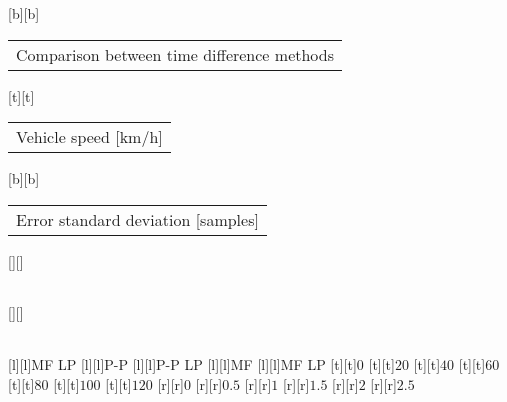 %
%
[b][b]{\fontsize{8}{12}\selectfont \setlength{\tabcolsep}{0pt}\begin{tabular}{c}Comparison between time difference methods\end{tabular}}%
[t][t]{\fontsize{8}{12}\selectfont \setlength{\tabcolsep}{0pt}\begin{tabular}{c}Vehicle speed [km/h]\end{tabular}}%
[b][b]{\fontsize{8}{12}\selectfont \setlength{\tabcolsep}{0pt}\begin{tabular}{c}Error standard deviation [samples]\end{tabular}}%
[][]{\fontsize{8}{12}\selectfont \setlength{\tabcolsep}{0pt}\begin{tabular}{c} \end{tabular}}%
[][]{\fontsize{4}{6}\selectfont \setlength{\tabcolsep}{0pt}\begin{tabular}{c} \end{tabular}}%
[l][l]{\fontsize{4}{6}\selectfont MF LP}%
[l][l]{\fontsize{4}{6}\selectfont P-P}%
[l][l]{\fontsize{4}{6}\selectfont P-P LP}%
[l][l]{\fontsize{4}{6}\selectfont MF}%
[l][l]{\fontsize{4}{6}\selectfont MF LP}%
%
\fontsize{6}{8}%
\selectfont%
%
[t][t]{$0$}%
[t][t]{$20$}%
[t][t]{$40$}%
[t][t]{$60$}%
[t][t]{$80$}%
[t][t]{$100$}%
[t][t]{$120$}%
%
[r][r]{$0$}%
[r][r]{$0.5$}%
[r][r]{$1$}%
[r][r]{$1.5$}%
[r][r]{$2$}%
[r][r]{$2.5$}%
%
%

